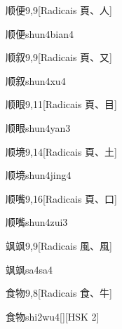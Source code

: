 \begin{entry}{顺便}{9,9}[Radicais ⾴、⼈]
  \begin{phonetics}{顺便}{shun4bian4}
  \end{phonetics}
\end{entry}

\begin{entry}{顺叙}{9,9}[Radicais ⾴、⼜]
  \begin{phonetics}{顺叙}{shun4xu4}
  \end{phonetics}
\end{entry}

\begin{entry}{顺眼}{9,11}[Radicais ⾴、⽬]
  \begin{phonetics}{顺眼}{shun4yan3}
  \end{phonetics}
\end{entry}

\begin{entry}{顺境}{9,14}[Radicais ⾴、⼟]
  \begin{phonetics}{顺境}{shun4jing4}
  \end{phonetics}
\end{entry}

\begin{entry}{顺嘴}{9,16}[Radicais ⾴、⼝]
  \begin{phonetics}{顺嘴}{shun4zui3}
  \end{phonetics}
\end{entry}

\begin{entry}{飒飒}{9,9}[Radicais ⾵、⾵]
  \begin{phonetics}{飒飒}{sa4sa4}
  \end{phonetics}
\end{entry}

\begin{entry}{食物}{9,8}[Radicais ⾷、⽜]
  \begin{phonetics}{食物}{shi2wu4}[][HSK 2]
  \end{phonetics}
\end{entry}

